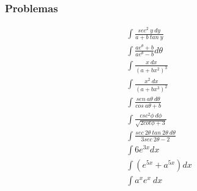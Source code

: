 \subsubsection{Problemas}
\begin{align}
	\int \frac{sec^2\:y\:dy}{a+b\:tan\:y}\\
	\int \frac{ae^\theta+b}{ae^\theta-b}d\theta\\
	\int \frac{x\:dx}{(a+bx^2)^3}\\
	\int \frac{x^2\:dx}{(a+bx^3)^2}\\
	\int \frac{sen\:a\theta\:d\theta}{cos\:a\theta+b}\\
	\int \frac{csc^2\phi\:d\phi}{\sqrt{2cot\phi+3}}\\
	\int \frac{sec\:2\theta\: tan\:2\theta\: d\theta}{3sec\:2\theta-2}\\
	\int 6 e^{3x}dx\\
	\int (e^{5x}+a^{5x})dx\\
	\int a^{x}e^x\:dx
\end{align}